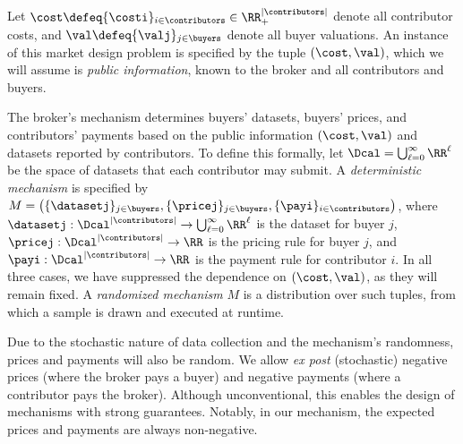 

Let  $\cost \defeq \{\costi\}_{i \in \contributors} \in \RR_+^{|\contributors|}$ denote all contributor costs, and $\val \defeq \{\valj\}_{j \in \buyers}$ denote all buyer valuations.
An instance of this market design problem is specified by the tuple $(\cost, \val)$, which we will assume is \emph{public information},
\ie known to the broker and all contributors and buyers.



The broker's mechanism determines buyers' datasets, buyers' prices, and contributors' payments based on the public information $(\cost,\val)$ and datasets reported by contributors.
To define this formally, let $\Dcal = \bigcup_{\ell=0}^\infty \RR^\ell$
be the space of datasets that each contributor may submit.
A \emph{deterministic mechanism} is specified by  
$M = \left(\{\datasetj\}_{j \in \buyers}, \{\pricej\}_{j \in \buyers}, \{\payi\}_{i \in \contributors}\right)
$,
where $\datasetj : \Dcal^{|\contributors|} \to \bigcup_{\ell=0}^\infty \RR^\ell$ is the dataset for buyer $j$,  
$\pricej : \Dcal^{|\contributors|} \to \RR$ is the pricing rule for buyer $j$, and  
$\payi : \Dcal^{|\contributors|} \to \RR$ is the payment rule for contributor $i$. 
In all three cases, we have suppressed the dependence on $(\cost,\val)$, as they will remain fixed.
A \emph{randomized mechanism} $M$ is a distribution over such tuples, from which a sample is drawn and executed at runtime.

Due to the stochastic nature of data collection and the mechanism's randomness, prices and payments will also be random. We allow \emph{ex post} (\ie stochastic) negative prices (where the broker pays a buyer) and negative payments (where a contributor pays the broker). Although unconventional, this enables the design of mechanisms with strong guarantees. Notably, in our mechanism, the expected prices and payments are always non-negative.




